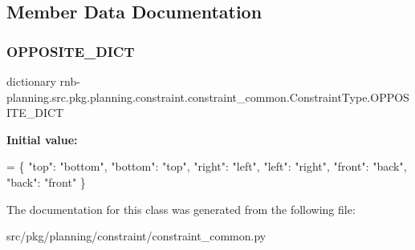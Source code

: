 \subsection{Member Data Documentation}
\mbox{\label{classrnb-planning_1_1src_1_1pkg_1_1planning_1_1constraint_1_1constraint__common_1_1_constraint_type_a6e4193f46f8addffdf54b20152f29330}} 
\subsubsection{\texorpdfstring{O\+P\+P\+O\+S\+I\+T\+E\+\_\+\+D\+I\+CT}{OPPOSITE\_DICT}}
{\footnotesize\ttfamily dictionary rnb-\/planning.\+src.\+pkg.\+planning.\+constraint.\+constraint\+\_\+common.\+Constraint\+Type.\+O\+P\+P\+O\+S\+I\+T\+E\+\_\+\+D\+I\+CT\hspace{0.3cm}{\ttfamily [static]}}

{\bfseries Initial value\+:}
\begin{DoxyCode}
= \{
    \textcolor{stringliteral}{"top"}: \textcolor{stringliteral}{"bottom"},
    \textcolor{stringliteral}{"bottom"}: \textcolor{stringliteral}{"top"},
    \textcolor{stringliteral}{"right"}: \textcolor{stringliteral}{"left"},
    \textcolor{stringliteral}{"left"}: \textcolor{stringliteral}{"right"},
    \textcolor{stringliteral}{"front"}: \textcolor{stringliteral}{"back"},
    \textcolor{stringliteral}{"back"}: \textcolor{stringliteral}{"front"}
\}
\end{DoxyCode}


The documentation for this class was generated from the following file\+:\begin{DoxyCompactItemize}
\item 
src/pkg/planning/constraint/constraint\+\_\+common.\+py\end{DoxyCompactItemize}
